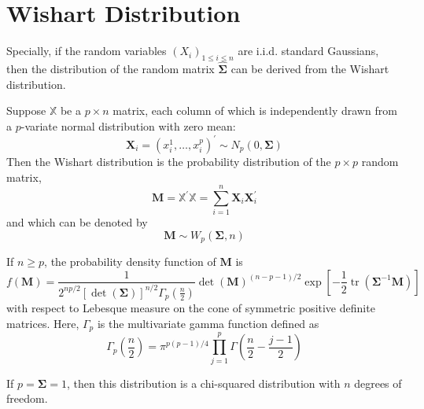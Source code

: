 \section{Wishart Distribution}

Specially, if the random variables $\left(X_{i}\right)_{1\leq i\leq n}$ are i.i.d. standard Gaussians, then the distribution of the random matrix $\widehat{\boldsymbol{\Sigma}}$ can be derived from the Wishart distribution.

\begin{definition}
    Suppose $\mathbb{X}$ be a $p\times n$ matrix, each column of which is independently drawn from a $p$-variate normal distribution with zero mean:
    \begin{equation*}
        \mathbf{X}_{i}=\left(x_{i}^{1},\ldots,x_{i}^{p}\right)^{\prime}\sim N_{p}(0,\boldsymbol{\Sigma})
    \end{equation*}
    Then the Wishart distribution is the probability distribution of the $p\times p$ random matrix,
    \begin{equation}
        \mathbf{M}=\mathbb{X}^{\prime}\mathbb{X}=\sum_{i=1}^{n}\mathbf{X}_{i}\mathbf{X}_{i}^{\prime}
    \end{equation}
    and which can be denoted by
    \begin{equation*}
        \mathbf{M}\sim W_{p}\left(\boldsymbol{\Sigma},n\right)
    \end{equation*}
\end{definition}

If $n\geq p$, the probability density function of $\mathbf{M}$ is
\begin{equation}
    f\left(\mathbf{M}\right)=\frac{1}{2^{np/2}\left[\operatorname{det}\left(\boldsymbol{\Sigma}\right)\right]^{n/2}\Gamma_{p}\left(\frac{n}{2}\right)}\operatorname{det}\left(\mathbf{M}\right)^{(n-p-1)/2}\exp\left[-\frac{1}{2}\operatorname{tr}\left(\boldsymbol{\Sigma}^{-1}\mathbf{M}\right)\right]
    \label{eq:pdf-wishart}
\end{equation}
with respect to Lebesque measure on the cone of symmetric positive definite matrices. Here, $\Gamma_{p}$ is the multivariate gamma function defined as
\begin{equation*}
    \Gamma_{p}\left(\frac{n}{2}\right)=\pi^{p(p-1)/4}\prod_{j=1}^{p}\Gamma\left(\frac{n}{2}-\frac{j-1}{2}\right)
\end{equation*}

\begin{remark}
    If $p=\boldsymbol{\Sigma}=1$, then this distribution is a chi-squared distribution with $n$ degrees of freedom.
\end{remark}

